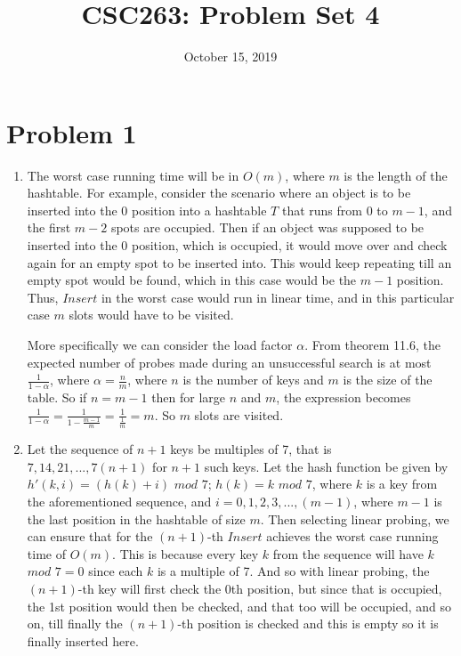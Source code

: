 \documentclass{article}
\title{CSC263: Problem Set 4}
\date{October 15, 2019}
\begin{document}
\maketitle

\section{Problem 1}

\begin{enumerate}[label=(\alph*)]

\item The worst case running time will be in $O(m)$, where $m$ is the length of the hashtable. For example, consider the scenario where an object is to be inserted into the $0$ position into a hashtable $T$ that runs from $0$ to $m-1$, and the first $m-2$ spots are occupied. Then if an object was supposed to be inserted into the $0$ position, which is occupied, it would move over and check again for an empty spot to be inserted into. This would keep repeating till an empty spot would be found, which in this case would be the $m-1$ position. Thus, $Insert$ in the worst case would run in linear time, and in this particular case $m$ slots would have to be visited.

More specifically we can consider the load factor $\alpha$. From theorem 11.6, the expected number of probes made during an unsuccessful search is at most $\frac{1}{1-\alpha}$, where $\alpha = \frac{n}{m}$, where $n$ is the number of keys and $m$ is the size of the table. So if $n = m - 1$ then for large $n$ and $m$, the expression becomes $\frac{1}{1-\alpha} = \frac{1}{1-\frac{m-1}{m}} = \frac{1}{\frac{1}{m}} = m$. So $m$ slots are visited.

\item Let the sequence of $n+1$ keys be multiples of 7, that is $7, 14, 21, ..., 7(n+1)$ for $n+1$ such keys. Let the hash function be given by $h'(k,i)= (h(k)+i)$ $mod$ $7$; $h(k) = k$ $mod$ $7$, where $k$ is a key from the aforementioned sequence, and $i = 0, 1, 2, 3,..., (m-1)$, where $m-1$ is the last position in the hashtable of size $m$. Then selecting linear probing, we can ensure that for the $(n+1)$-th $Insert$ achieves the worst case running time of $O(m)$. This is because every key $k$ from the sequence will have $k$ $mod$ $7 = 0$ since each $k$ is a multiple of 7. And so with linear probing, the $(n+1)$-th key will first check the 0th position, but since that is occupied, the 1st position would then be checked, and that too will be occupied, and so on, till finally the $(n+1)$-th position is checked and this is empty so it is finally inserted here.


\end{enumerate}
\end{document}
